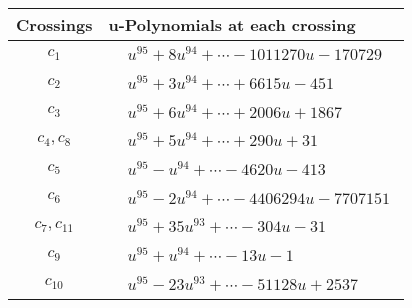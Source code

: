 \documentclass[1p]{elsarticle_modified}
\theoremstyle{definition}
\begin{document}
\begin{tabular}{m{50pt}|m{274pt}}
Crossings & \hspace{64pt}u-Polynomials at each crossing \\
\hline $$\begin{aligned}c_{1}\end{aligned}$$&$\begin{aligned}
&u^{95}+8 u^{94}+\cdots-1011270 u-170729
\end{aligned}$\\
\hline $$\begin{aligned}c_{2}\end{aligned}$$&$\begin{aligned}
&u^{95}+3 u^{94}+\cdots+6615 u-451
\end{aligned}$\\
\hline $$\begin{aligned}c_{3}\end{aligned}$$&$\begin{aligned}
&u^{95}+6 u^{94}+\cdots+2006 u+1867
\end{aligned}$\\
\hline $$\begin{aligned}c_{4},c_{8}\end{aligned}$$&$\begin{aligned}
&u^{95}+5 u^{94}+\cdots+290 u+31
\end{aligned}$\\
\hline $$\begin{aligned}c_{5}\end{aligned}$$&$\begin{aligned}
&u^{95}- u^{94}+\cdots-4620 u-413
\end{aligned}$\\
\hline $$\begin{aligned}c_{6}\end{aligned}$$&$\begin{aligned}
&u^{95}-2 u^{94}+\cdots-4406294 u-7707151
\end{aligned}$\\
\hline $$\begin{aligned}c_{7},c_{11}\end{aligned}$$&$\begin{aligned}
&u^{95}+35 u^{93}+\cdots-304 u-31
\end{aligned}$\\
\hline $$\begin{aligned}c_{9}\end{aligned}$$&$\begin{aligned}
&u^{95}+u^{94}+\cdots-13 u-1
\end{aligned}$\\
\hline $$\begin{aligned}c_{10}\end{aligned}$$&$\begin{aligned}
&u^{95}-23 u^{93}+\cdots-51128 u+2537
\end{aligned}$\\
\hline
\end{tabular}\\~\\
\end{document}
